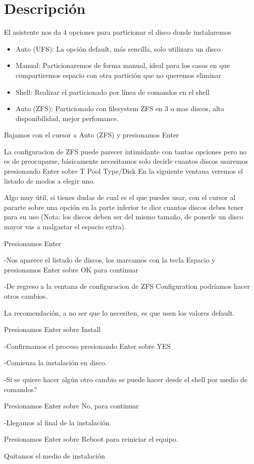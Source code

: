 \documentclass[12pt,letterspaper]{report}
\begin{document}
\chapter*{Descripción}
El asistente nos da 4 opciones para particionar el disco donde instalaremos

\begin{itemize}
\item Auto (UFS): La opción default, más sencilla, solo utilizara un disco
\item Manual: Particionaremos de forma manual, ideal para los casos en que compartiremos espacio con otra partición que no queremos eliminar
\item Shell: Realizar el particionado por línea de comandos en el shell
\item Auto (ZFS): Particionado con filesystem ZFS en 3 o mas discos, alta disponibilidad, mejor perfomance.
\end{itemize}

Bajamos con el cursor a Auto (ZFS) y presionamos Enter\par
\vspace {0.3cm}
La configuracion de ZFS puede parecer intimidante con tantas opciones pero no es de preocuparse, básicamente necesitamos solo decirle cuantos discos usaremos presionando Enter sobre T Pool Type/Disk
\vspace {0.3cm}
En la siguiente ventana veremos el listado de modos a elegir uno.

Algo muy útil, si tienes dudas de cual es el que puedes usar, con el cursor al pararte sobre una opción en la parte inferior te dice cuantos discos debes tener para su uso (Nota: los discos deben ser del mismo tamaño, de ponerle un disco mayor vas a malgastar el espacio extra).\par
\vspace {0.3cm}
Presionamos Enter \par
\vspace {0.3cm}
-Nos aparece el listado de discos, los marcamos con la tecla Espacio y presionamos Enter sobre OK para continuar\par

-De regreso a la ventana de configuracion de ZFS Configuration podríamos hacer otros cambios.\par
\vspace {0.3cm}
La recomendación, a no ser que lo necesiten, es que usen los valores default.\par
\vspace {0.3cm}
Presionamos Enter sobre Install\par
\vspace {0.3cm}
-Confirmamos el proceso presionando Enter sobre YES\par
\vspace {0.3cm}
-Comienza la instalación en disco.\par
\vspace {0.3cm}
-Si se quiere hacer algún otro cambio se puede hacer desde el shell por medio de comandos?\par
\vspace {0.3cm}
Presionamos Enter sobre No, para continuar\par
\vspace {0.3cm}
-Llegamos al final de la instalación.\par
\vspace {0.3cm}
Presionamos Enter sobre Reboot para reiniciar el equipo.\par
\vspace {0.3cm}
Quitamos el medio de instalación\par
\vspace {0.3cm}
\end{document}
